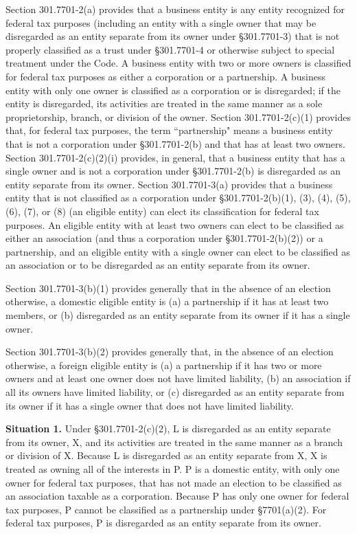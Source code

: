 \begin{select}
Section 301.7701-2(a) provides that a business entity is any entity recognized for federal tax 
purposes (including an entity with a single owner that may be disregarded as an entity separate 
from its owner under \S301.7701-3) that is not properly classified as a trust under \S301.7701-4 or 
otherwise subject to special treatment under the Code. A business entity with two or more owners is 
classified for federal tax purposes as either a corporation or a partnership. A business entity with 
only one owner is classified as a corporation or is disregarded; if the entity is disregarded, its 
activities are treated in the same manner as a sole proprietorship, branch, or division of the owner. 
Section 301.7701-2(c)(1) provides that, for federal tax purposes, the term ``partnership" means a 
business entity that is not a corporation under \S301.7701-2(b) and that has at least two owners. 
Section 301.7701-2(c)(2)(i) provides, in general, that a business entity that has a single owner and 
is not a corporation under \S301.7701-2(b) is disregarded as an entity separate from its owner. 
Section 301.7701-3(a) provides that a business entity that is not classified as a corporation under \S301.7701-2(b)(1), (3), (4), (5), (6), (7), or (8) (an eligible entity) can elect its classification 
for federal tax purposes. An eligible entity with at least two owners can elect to be classified as 
either an association (and thus a corporation under \S301.7701-2(b)(2)) or a partnership, and an 
eligible entity with a single owner can elect to be classified as an association or to be disregarded as 
an entity separate from its owner. 

Section 301.7701-3(b)(1) provides generally that in the absence of an election otherwise, a domestic 
eligible entity is (a) a partnership if it has at least two members, or (b) disregarded as an entity 
separate from its owner if it has a single owner.
 
Section 301.7701-3(b)(2) provides generally that, in the absence of an election otherwise, a foreign 
eligible entity is (a) a partnership if it has two or more owners and at least one owner does not have 
limited liability, (b) an association if all its owners have limited liability, or (c) disregarded as an 
entity separate from its owner if it has a single owner that does not have limited liability. 

\textbf{Situation 1.} Under \S301.7701-2(c)(2), L is disregarded as an entity separate from its owner, X, and 
its activities are treated in the same manner as a branch or division of X. Because L is 
disregarded as an entity separate from X, X is treated as owning all of the interests in P. P is a 
domestic entity, with only one owner for federal tax purposes, that has not made an election to be 
classified as an association taxable as a corporation. Because P has only one owner for federal tax 
purposes, P cannot be classified as a partnership under \S7701(a)(2). For federal tax purposes, P is 
disregarded as an entity separate from its owner. 


\end{select}
